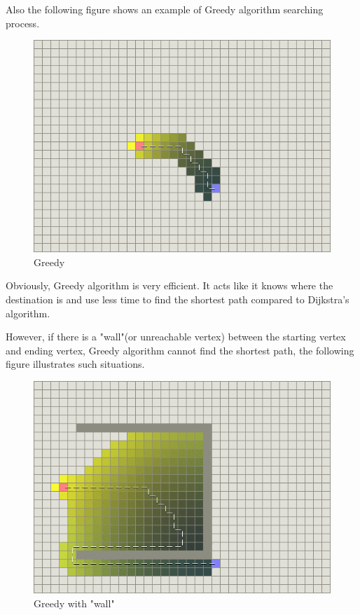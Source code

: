 \documentclass[12pt]{article}
\begin{document}
Also the following figure shows an example of Greedy algorithm searching process.
\begin{figure}[H]
    \centering 
    \includegraphics[scale = 0.6]{4.png}
    \caption{Greedy}
\end{figure}

Obviously, Greedy algorithm is very efficient. It acts like it knows where the destination is and use less time to find the shortest path compared to Dijkstra's algorithm.

However, if there is a "wall"(or unreachable vertex) between the starting vertex and ending vertex, Greedy algorithm cannot find the shortest path, the following figure illustrates such situations.

\begin{figure}[H]
    \centering 
    \includegraphics[scale = 0.6]{5.png}
    \caption{Greedy with "wall"}
\end{figure}
\end{document}
